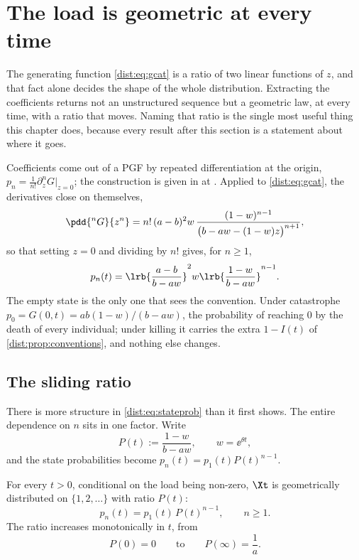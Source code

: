 \section{The load is geometric at every time}
\label{dist:sec:geometric}

The generating function \cref{dist:eq:gcat} is a ratio of two linear
functions of $z$, and that fact alone decides the shape of the whole
distribution. Extracting the coefficients returns not an unstructured sequence
but a geometric law, at every time, with a ratio that moves. Naming that ratio
is the single most useful thing this chapter does, because every result after
this section is a statement about where it goes.

Coefficients come out of a PGF by repeated differentiation at the origin,
$p_n=\frac{1}{n!}\partial_z^nG|_{z=0}$; the construction is given in
 at
. Applied to
\cref{dist:eq:gcat}, the derivatives close on themselves,
\begin{equation}
\pdd{^n G}{z^n}
= n!\,(a-b)^2 w\,
\frac{(1-w)^{n-1}}{\bigl(b-aw-(1-w)z\bigr)^{n+1}},
\label{dist:eq:dnG}
\end{equation}
so that setting $z=0$ and dividing by $n!$ gives, for $n\ge1$,
\begin{equation}
p_n(t)=\lrb{\frac{a-b}{b-aw}}^{2}w
\lrb{\frac{1-w}{b-aw}}^{n-1}.
\label{dist:eq:stateprob}
\end{equation}
The empty state is the only one that sees the convention. Under catastrophe
$p_0=G(0,t)=ab(1-w)/(b-aw)$, the probability of reaching $0$ by the death of
every individual; under killing it carries the extra $1-I(t)$ of
\cref{dist:prop:conventions}, and nothing else changes.

\subsection{The sliding ratio}
\label{dist:sec:sliding}

There is more structure in \cref{dist:eq:stateprob} than it first shows. The
entire dependence on $n$ sits in one factor. Write
\begin{equation}
P(t):=\frac{1-w}{b-aw},
\qquad w=\ee^{\theta t},
\label{dist:eq:pdef}
\end{equation}
and the state probabilities become $p_n(t)=p_1(t)P(t)^{n-1}$.

\begin{theorem}
\label{dist:thm:geometric}
For every $t>0$, conditional on the load being non-zero, $\Xt$ is
geometrically distributed on $\{1,2,\ldots\}$ with ratio $P(t)$:
\begin{equation}
p_n(t)=p_1(t)\,P(t)^{n-1},\qquad n\ge1.
\label{dist:eq:geometric}
\end{equation}
The ratio increases monotonically in $t$, from
\begin{equation}
P(0)=0 \qquad\text{to}\qquad P(\infty)=\frac1a .
\label{dist:eq:plimits}
\end{equation}
\end{theorem}

